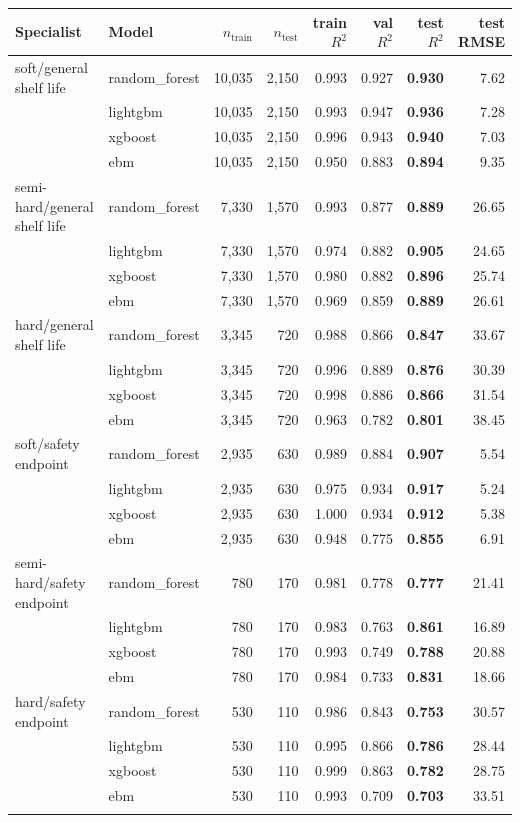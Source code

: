 \begin{tabular}{llrrrrrr}
\toprule
Specialist & Model & $n_{\text{train}}$ & $n_{\text{test}}$ & train $R^2$ & val $R^2$ & test $R^2$ & test RMSE \\
\midrule
soft/general shelf life & random\_forest & 10,035 & 2,150 & 0.993 & 0.927 & \textbf{0.930} & 7.62 \\
 & lightgbm & 10,035 & 2,150 & 0.993 & 0.947 & \textbf{0.936} & 7.28 \\
 & xgboost & 10,035 & 2,150 & 0.996 & 0.943 & \textbf{0.940} & 7.03 \\
 & ebm & 10,035 & 2,150 & 0.950 & 0.883 & \textbf{0.894} & 9.35 \\
\addlinespace[2pt]
semi-hard/general shelf life & random\_forest & 7,330 & 1,570 & 0.993 & 0.877 & \textbf{0.889} & 26.65 \\
 & lightgbm & 7,330 & 1,570 & 0.974 & 0.882 & \textbf{0.905} & 24.65 \\
 & xgboost & 7,330 & 1,570 & 0.980 & 0.882 & \textbf{0.896} & 25.74 \\
 & ebm & 7,330 & 1,570 & 0.969 & 0.859 & \textbf{0.889} & 26.61 \\
\addlinespace[2pt]
hard/general shelf life & random\_forest & 3,345 & 720 & 0.988 & 0.866 & \textbf{0.847} & 33.67 \\
 & lightgbm & 3,345 & 720 & 0.996 & 0.889 & \textbf{0.876} & 30.39 \\
 & xgboost & 3,345 & 720 & 0.998 & 0.886 & \textbf{0.866} & 31.54 \\
 & ebm & 3,345 & 720 & 0.963 & 0.782 & \textbf{0.801} & 38.45 \\
\addlinespace[2pt]
soft/safety endpoint & random\_forest & 2,935 & 630 & 0.989 & 0.884 & \textbf{0.907} & 5.54 \\
 & lightgbm & 2,935 & 630 & 0.975 & 0.934 & \textbf{0.917} & 5.24 \\
 & xgboost & 2,935 & 630 & 1.000 & 0.934 & \textbf{0.912} & 5.38 \\
 & ebm & 2,935 & 630 & 0.948 & 0.775 & \textbf{0.855} & 6.91 \\
\addlinespace[2pt]
semi-hard/safety endpoint & random\_forest & 780 & 170 & 0.981 & 0.778 & \textbf{0.777} & 21.41 \\
 & lightgbm & 780 & 170 & 0.983 & 0.763 & \textbf{0.861} & 16.89 \\
 & xgboost & 780 & 170 & 0.993 & 0.749 & \textbf{0.788} & 20.88 \\
 & ebm & 780 & 170 & 0.984 & 0.733 & \textbf{0.831} & 18.66 \\
\addlinespace[2pt]
hard/safety endpoint & random\_forest & 530 & 110 & 0.986 & 0.843 & \textbf{0.753} & 30.57 \\
 & lightgbm & 530 & 110 & 0.995 & 0.866 & \textbf{0.786} & 28.44 \\
 & xgboost & 530 & 110 & 0.999 & 0.863 & \textbf{0.782} & 28.75 \\
 & ebm & 530 & 110 & 0.993 & 0.709 & \textbf{0.703} & 33.51 \\
\addlinespace[2pt]
\bottomrule
\end{tabular}